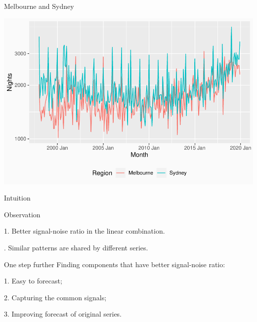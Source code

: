 \documentclass[14pt,ignorenonframetext,]{beamer}
\begin{document}
\begin{frame}{Melbourne and Sydney}
\protect\hypertarget{melbourne-and-sydney}{}
\begin{center}
\includegraphics[width=\linewidth]{plot/p_syd_mel}
\end{center}
\end{frame}

\begin{frame}{Intuition}
\protect\hypertarget{intuition}{}
\begin{block}{Observation}

1. Better signal-noise ratio in the linear combination.

. Similar patterns are shared by different series.
\end{block}

\pause

\begin{alertblock}{One step further}
Finding components that have better signal-noise ratio:


1. Easy to forecast;

2. Capturing the common signals;

3. Improving forecast of original series.
\end{alertblock}
\end{frame}
\end{document}
